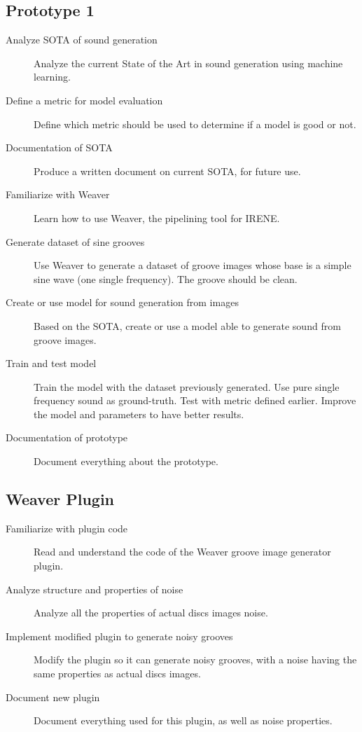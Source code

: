 \documentclass[12pt, twoside]{article}
\begin{document}
\subsection{Prototype 1}
\begin{description}
	\item[Analyze SOTA of sound generation] Analyze the current State of the Art in sound generation using machine learning.
	\item[Define a metric for model evaluation] Define which metric should be used to determine if a model is good or not.
	\item[Documentation of SOTA] Produce a written document on current SOTA, for future use.
	\item[Familiarize with Weaver] Learn how to use Weaver, the pipelining tool for IRENE.
	\item[Generate dataset of sine grooves] Use Weaver to generate a dataset of groove images whose base is a simple sine wave (one single frequency). The groove should be clean.
	\item[Create or use model for sound generation from images] Based on the SOTA, create or use a model able to generate sound from groove images.
	\item[Train and test model] Train the model with the dataset previously generated.  Use pure single frequency sound as ground-truth. Test with metric defined earlier. Improve the model and parameters to have better results.
	\item[Documentation of prototype] Document everything about the prototype.
\end{description}
\subsection{Weaver Plugin}
\begin{description}
	\item[Familiarize with plugin code] Read and understand the code of the Weaver groove image generator plugin.
	\item[Analyze structure and properties of noise] Analyze all the properties of actual discs images noise.
	\item[Implement modified plugin to generate noisy grooves] Modify the plugin so it can generate noisy grooves, with a noise having the same properties as actual discs images.
	\item[Document new plugin] Document everything used for this plugin, as well as noise properties.
\end{description}
\end{document}
